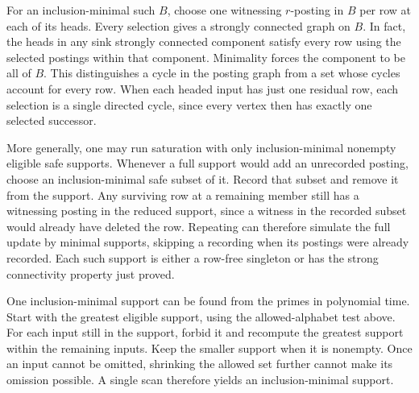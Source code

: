 For an inclusion-minimal such $B$, choose one
witnessing $r$-posting in $B$ per row at each of its
heads. Every selection gives a strongly connected
graph on $B$. In fact, the heads in any sink
strongly connected component satisfy every row
using the selected postings within that component.
Minimality forces the component to be all of $B$.
This distinguishes a cycle in the posting graph
from a set whose cycles account for every row.
When each headed input has just one residual row,
each selection is a single directed cycle, since
every vertex then has exactly one selected successor.

More generally, one may run saturation with only
inclusion-minimal nonempty eligible safe supports.
Whenever a full support would add an unrecorded
posting, choose an inclusion-minimal safe subset
of it. Record that subset and remove it from the
support. Any surviving row at a remaining member
still has a witnessing posting in the reduced
support, since a witness in the recorded subset
would already have deleted the row. Repeating
can therefore simulate the full update by minimal
supports, skipping a recording when its postings
were already recorded. Each such support is either
a row-free singleton or has the strong connectivity
property just proved.

One inclusion-minimal support can be found from the
primes in polynomial time. Start with the greatest
eligible support, using the allowed-alphabet test
above. For each input still in the support, forbid
it and recompute the greatest support within the
remaining inputs. Keep the smaller support when
it is nonempty. Once an input cannot be omitted,
shrinking the allowed set further cannot make its
omission possible. A single scan therefore yields
an inclusion-minimal support.

